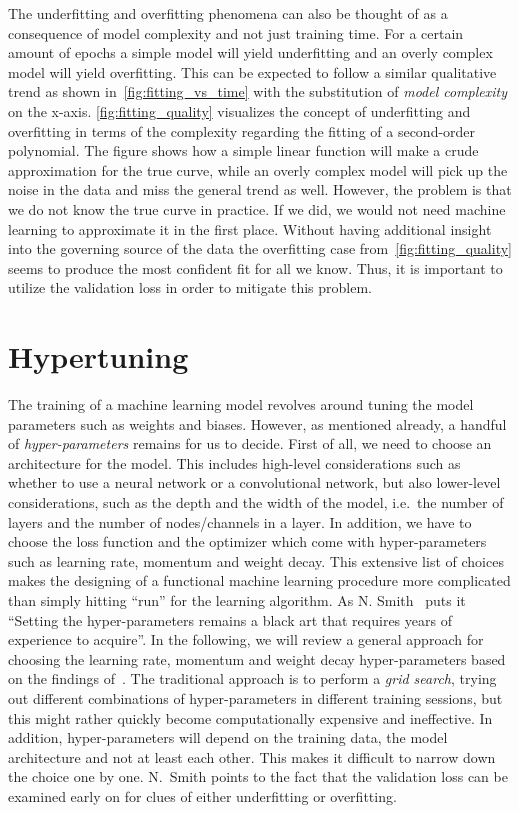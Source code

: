 The underfitting and overfitting phenomena can also be thought of as a
consequence of model complexity and not just training time. For a certain amount
of epochs a simple model will yield underfitting and an overly complex model
will yield overfitting. This can be expected to follow a similar qualitative
trend as shown in~\cref{fig:fitting_vs_time} with the substitution of
\textit{model complexity} on the x-axis. \cref{fig:fitting_quality} visualizes
the concept of underfitting and overfitting in terms of the complexity regarding
the fitting of a second-order polynomial. The figure shows how a simple linear
function will make a crude approximation for the true curve, while an overly
complex model will pick up the noise in the data and miss the general trend as
well. However, the problem is that we do not know the true curve in practice. If
we did, we would not need machine learning to approximate it in the first place.
Without having additional insight into the governing source of the data the
overfitting case from~\cref{fig:fitting_quality} seems to produce the most confident fit for all we know. Thus, it is important to utilize the validation loss in order to mitigate this problem. 




\section{Hypertuning}\label{sec:hypertuning}
The training of a machine learning model revolves around tuning the model parameters such as weights and biases. However, as mentioned already, a handful of \textit{hyper-parameters} remains for us to decide. First of all, we need to choose an architecture for the model. This includes high-level considerations such as whether to use a neural network or a convolutional network, but also lower-level considerations, such as the depth and the width of the model, i.e.\ the number of layers and the number of nodes/channels in a layer. In addition, we have to choose the loss function and the optimizer which come with hyper-parameters such as learning rate, momentum and weight decay. This extensive list of choices makes the designing of a functional machine learning procedure more complicated than simply hitting ``run'' for the learning algorithm. As N. Smith~\cite{smith2018disciplined} puts it ``Setting the
hyper-parameters remains a black art that requires years of experience to
acquire''. In the following, we will review a general approach for choosing the learning rate, momentum and weight decay hyper-parameters based on the findings of~\cite{smith2018disciplined}. The traditional approach is to
perform a \textit{grid search}, trying out different combinations of hyper-parameters in different training sessions, but this might rather quickly become computationally expensive and ineffective. In addition, hyper-parameters will depend on the training data, the model architecture and not at least each other. This makes it difficult to narrow down the choice one by one. N.\ Smith points to the fact that the validation loss can be examined early on for
clues of either underfitting or overfitting. 

